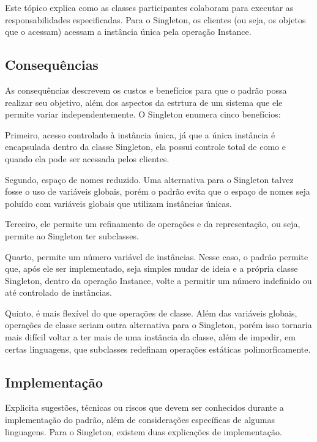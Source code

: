 Este tópico explica como as classes participantes 
colaboram para executar as responsabilidades 
especificadas. Para o Singleton, os clientes (ou seja, 
os objetos que o acessam) acessam a instância única 
pela operação Instance.

\subsection*{Consequências}

As consequências descrevem os custos e benefícios para 
que o padrão possa realizar seu objetivo, além dos 
aspectos da estrtura de um sistema que ele permite variar 
independentemente. O Singleton enumera cinco benefícios:

Primeiro, acesso controlado à instância única, já que 
a única instância é encapsulada dentro da classe 
Singleton, ela possui controle total de como e quando 
ela pode ser acessada pelos clientes.

Segundo, espaço de nomes reduzido. Uma alternativa 
para o Singleton talvez fosse o uso de variáveis 
globais, porém o padrão evita que o espaço de nomes 
seja poluído com variáveis globais que utilizam 
instâncias únicas.

Terceiro, ele permite um refinamento de operações e da 
representação, ou seja, permite ao Singleton ter 
subclasses.

Quarto, permite um número variável de instâncias. Nesse 
caso, o padrão permite que, após ele ser implementado, 
seja simples mudar de ideia e a própria classe Singleton, 
dentro da operação Instance, volte a permitir um número 
indefinido ou até controlado de instâncias.

Quinto, é mais flexível do que operações de classe. Além 
das variáveis globais, operações de classe seriam outra 
alternativa para o Singleton, porém isso tornaria mais 
difícil voltar a ter mais de uma instância da classe, 
além de impedir, em certas linguagens, que subclasses 
redefinam operações estáticas polimorficamente.

\subsection*{Implementação}

Explicita sugestões, técnicas ou riscos que devem 
ser conhecidos durante a implementação do padrão, 
além de considerações específicas de algumas 
linguagens. Para o Singleton, existem duas 
explicações de implementação.

